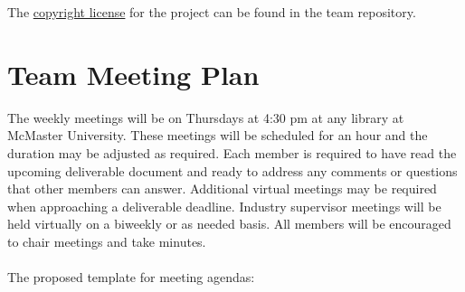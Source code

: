 \documentclass{article}
\begin{document}
The \href{https://github.com/M9Huynh/technically-functional/blob/f05da0acf59e6b8a08d67f9132471c1a17b5afef/LICENSE}{copyright license} for the project can be found in the team repository.

\section{Team Meeting Plan}

The weekly meetings will be on Thursdays at 4:30 pm at any library at McMaster University. These meetings will be scheduled for an hour and the duration may be adjusted as required.
Each member is required to have read the upcoming deliverable document and ready to address any comments or questions that other members can answer. Additional virtual meetings may be required when approaching a deliverable deadline. Industry supervisor meetings will be held virtually on a biweekly or as needed basis. All members will be encouraged to chair meetings and take minutes. \\
\\ The proposed template for meeting agendas: 
\end{document}
